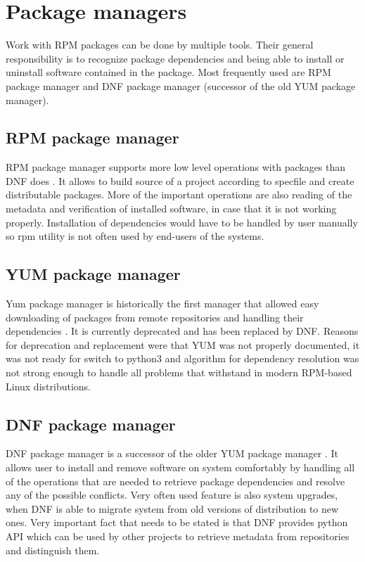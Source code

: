 \section{Package managers}
Work with RPM packages can be done by multiple tools. Their general responsibility is to recognize
package dependencies and being able to install or uninstall software contained in the package.
Most frequently used are RPM package manager and DNF package manager (successor of the old
YUM package manager).

\subsection*{RPM package manager}
RPM package manager supports more low level operations with packages than DNF does \cite{RPMPackageManager}. It allows
to build source of a project according to specfile and create distributable packages. More of the
important operations are also reading of the metadata and verification of installed software, in
case that it is not working properly. Installation of dependencies would have to be handled by user
manually so rpm utility is not often used by end-users of the systems.

\subsection*{YUM package manager}
Yum package manager is historically the first manager that allowed easy downloading of packages
from remote repositories and handling their dependencies \cite{YUMPackageManager}. It is currently deprecated and has been
replaced by DNF. Reasons for deprecation and replacement were that YUM was not properly documented,
it was not ready for switch to python3 and algorithm for dependency resolution was not strong enough
to handle all problems that withstand in modern RPM-based Linux distributions.

\subsection*{DNF package manager}
DNF package manager is a successor of the older YUM package manager \cite{DNFPackageManager}. It allows user to install and remove software
on system comfortably by handling all of the operations that are needed to retrieve package dependencies
and resolve any of the possible conflicts. Very often used feature is also system upgrades, when
DNF is able to migrate system from old versions of distribution to new ones. Very important fact
that needs to be stated is that DNF provides python API which can be used by other projects to retrieve metadata
from repositories and distinguish them.

